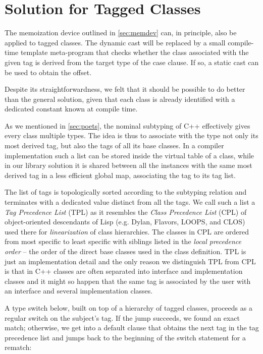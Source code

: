 \documentclass[preprint]{sigplanconf}
\begin{document}
\section{Solution for Tagged Classes}
\label{sec:cotc}

The memoization device outlined in \textsection\ref{sec:memdev} can, in principle, also be 
applied to tagged classes. The dynamic cast will be replaced by a small 
compile-time template meta-program that checks whether the class associated with 
the given tag is derived from the target type of the case clause. If so, a static 
cast can be used to obtain the offset.

Despite its straightforwardness, we felt that it should be possible to do better 
than the general solution, given that each class is already identified with a 
dedicated constant known at compile time.

As we mentioned in \textsection\ref{sec:poets}, the nominal subtyping of C++ 
effectively gives every class multiple types. The idea is thus to associate with 
the type not only its most derived tag, but also the tags of all its base classes.
In a compiler implementation such a list can be stored inside the virtual table 
of a class, while in our library solution it is shared between all the instances 
with the same most derived tag in a less efficient global map, associating the 
tag to its tag list.

The list of tags is topologically sorted according to the subtyping relation 
and terminates with a dedicated value distinct from all the tags. We call such a 
list a \emph{Tag Precedence List} (TPL) as it resembles the \emph{Class 
Precedence List} (CPL) of object-oriented descendants of Lisp (e.g. Dylan, 
Flavors, LOOPS, and CLOS) used there for \emph{linearization} of class 
hierarchies. The classes in CPL are ordered from most specific to least specific 
with siblings listed in the \emph{local precedence order} -- the order of the 
direct base classes used in the class definition. TPL is just an implementation 
detail and the only reason we distinguish TPL from CPL is that in C++ classes 
are often separated into interface and implementation classes and it might so 
happen that the same tag is associated by the user with an interface and several 
implementation classes. 

A type switch below, built on top of a hierarchy of tagged classes, proceeds as 
a regular switch on the subject's tag. If the jump succeeds, we found an exact 
match; otherwise, we get into a default clause that obtains the next tag in the 
tag precedence list and jumps back to the beginning of the switch statement for a 
rematch:
\end{document}
